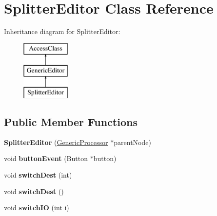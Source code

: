 \hypertarget{classSplitterEditor}{\section{Splitter\-Editor Class Reference}
\label{classSplitterEditor}
}
Inheritance diagram for Splitter\-Editor\-:\begin{figure}[H]
\begin{center}
\leavevmode
\includegraphics[height=3.000000cm]{classSplitterEditor}
\end{center}
\end{figure}
\subsection*{Public Member Functions}
\begin{DoxyCompactItemize}
\item 
\hypertarget{classSplitterEditor_aaf755e6bc0447d9660365a5fbd40f052}{{\bfseries Splitter\-Editor} (\hyperlink{classGenericProcessor}{Generic\-Processor} $\ast$parent\-Node)}\label{classSplitterEditor_aaf755e6bc0447d9660365a5fbd40f052}

\item 
\hypertarget{classSplitterEditor_a8965e72d47eacbb196b78c19ff441526}{void {\bfseries button\-Event} (Button $\ast$button)}\label{classSplitterEditor_a8965e72d47eacbb196b78c19ff441526}

\item 
\hypertarget{classSplitterEditor_a562704e5e9dd487175881e18820b958f}{void {\bfseries switch\-Dest} (int)}\label{classSplitterEditor_a562704e5e9dd487175881e18820b958f}

\item 
\hypertarget{classSplitterEditor_a55deac87232a7e7d15b0c0d3fe4d8256}{void {\bfseries switch\-Dest} ()}\label{classSplitterEditor_a55deac87232a7e7d15b0c0d3fe4d8256}

\item 
\hypertarget{classSplitterEditor_a192851e62390ad3aeb5fe2e98ddb50f3}{void {\bfseries switch\-I\-O} (int i)}\label{classSplitterEditor_a192851e62390ad3aeb5fe2e98ddb50f3}

\end{DoxyCompactItemize}
